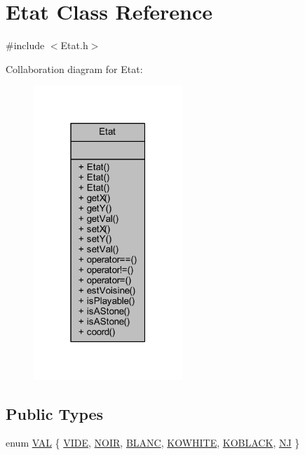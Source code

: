 \hypertarget{class_etat}{}\section{Etat Class Reference}
\label{class_etat}


{\ttfamily \#include $<$Etat.\+h$>$}



Collaboration diagram for Etat\+:
\nopagebreak
\begin{figure}[H]
\begin{center}
\leavevmode
\includegraphics[width=159pt]{class_etat__coll__graph}
\end{center}
\end{figure}
\subsection*{Public Types}
\begin{DoxyCompactItemize}
\item 
enum \hyperlink{class_etat_af3ddb2296ffc379b7f3ad2bf832f294e}{V\+AL} \{ \newline
\hyperlink{class_etat_af3ddb2296ffc379b7f3ad2bf832f294ea4811ee91e77f4300db04a9451fd0e0f0}{V\+I\+DE}, 
\hyperlink{class_etat_af3ddb2296ffc379b7f3ad2bf832f294ea6e8dd9025eff15a0d6a71268d7e34632}{N\+O\+IR}, 
\hyperlink{class_etat_af3ddb2296ffc379b7f3ad2bf832f294ea386cdf6b926ee1da9e6469350d5928c8}{B\+L\+A\+NC}, 
\hyperlink{class_etat_af3ddb2296ffc379b7f3ad2bf832f294ea9b3dd2418f67863f1da1da56f34fafff}{K\+O\+W\+H\+I\+TE}, 
\newline
\hyperlink{class_etat_af3ddb2296ffc379b7f3ad2bf832f294ea14f75cb5bd86150422cbf856df2d1e92}{K\+O\+B\+L\+A\+CK}, 
\hyperlink{class_etat_af3ddb2296ffc379b7f3ad2bf832f294ea91e6e22a0ee67bc1371a024e1b2ded64}{NJ}
 \}
\end{DoxyCompactItemize}
